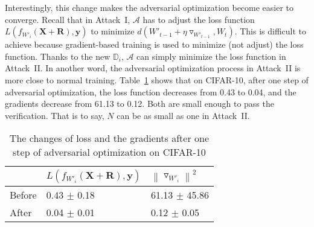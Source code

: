 \documentclass[conference]{IEEEtran}
\newcommand{\Adv}{\mathcal{A}\xspace}
\begin{document}
Interestingly, this change makes the adversarial optimization become easier to converge. 
Recall that in Attack~I, $\Adv$ has to adjust the loss function $L(f_{W'_i}(\mathbf{X}+\mathbf{R}), \mathbf{y})$ to minimize $d(W'_{t-1}+\eta \triangledown_{W'_{t-1}}, W_{t})$. 
This is difficult to {achieve\EndAccSupp{}} because gradient-based training is used to minimize (not adjust) the loss function.
Thanks to the new $\mathbb{D}_i$, $\Adv$ can simply minimize the loss function in Attack~II.
In another word, the adversarial optimization process in Attack~II is more close to {normal\EndAccSupp{}} training.
Table~\ref{tab:loss-diff} shows that on CIFAR-10, after one step of adversarial optimization, the loss function {decreases\EndAccSupp{}} from 0.43 to 0.04, and the gradients decrease from 61.13 to 0.12.
Both are small enough to pass the verification.
That is to say, $N$ can be as small as one in Attack~II.



\begin{table}[htb]
\centering
\caption{The changes of loss and the gradients after one step of adversarial optimization on CIFAR-10}
\begin{tabular}{@{}lll@{}}
\toprule
 & $L(f_{W'_i}(\mathbf{X}+\mathbf{R}), \mathbf{y})$ & $\left \|\triangledown_{W'_i}\right \|^{2}$ \\ \midrule
Before & 0.43 $\pm$ 0.18 &  61.13 $\pm$ 45.86 \\
After & 0.04 $\pm$ 0.01 & {0.12 $\pm$ 0.05}\\ \bottomrule
\end{tabular}
\label{tab:loss-diff}
\end{table}
\end{document}
